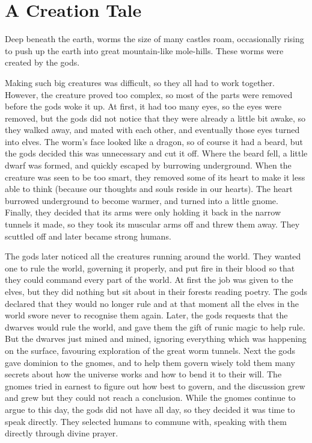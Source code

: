 \section{A Creation Tale}

\begin{multicols}{2}

\begin{exampletext}

\noindent Deep beneath the earth, worms the size of many castles roam, occasionally rising to push up the earth into great mountain-like mole-hills.
These worms were created by the gods.

Making such big creatures was difficult, so they all had to work together.
However, the creature proved too complex, so most of the parts were removed before the gods woke it up.
At first, it had too many eyes, so the eyes were removed, but the gods did not notice that they were already a little bit awake, so they walked away, and mated with each other, and eventually those eyes turned into elves.
The worm's face looked like a dragon, so of course it had a beard, but the gods decided this was unnecessary and cut it off.
Where the beard fell, a little dwarf was formed, and quickly escaped by burrowing underground.
When the creature was seen to be too smart, they removed some of its heart to make it less able to think (because our thoughts and souls reside in our hearts).
The heart burrowed underground to become warmer, and turned into a little gnome.
Finally, they decided that its arms were only holding it back in the narrow tunnels it made, so they took its muscular arms off and threw them away.
They scuttled off and later became strong humans.

The gods later noticed all the creatures running around the world.
They wanted one to rule the world, governing it properly, and put fire in their blood so that they could command every part of the world.
At first the job was given to the elves, but they did nothing but sit about in their forests reading poetry.
The gods declared that they would no longer rule and at that moment all the elves in the world swore never to recognise them again.
Later, the gods requests that the dwarves would rule the world, and gave them the gift of runic magic to help rule.
But the dwarves just mined and mined, ignoring everything which was happening on the surface, favouring exploration of the great worm tunnels.
Next the gods gave dominion to the gnomes, and to help them govern wisely told them many secrets about how the universe works and how to bend it to their will.
The gnomes tried in earnest to figure out how best to govern, and the discussion grew and grew but they could not reach a conclusion.
While the gnomes continue to argue to this day, the gods did not have all day, so they decided it was time to speak directly.
They selected humans to commune with, speaking with them directly through divine prayer.


\end{exampletext}
\end{multicols}
